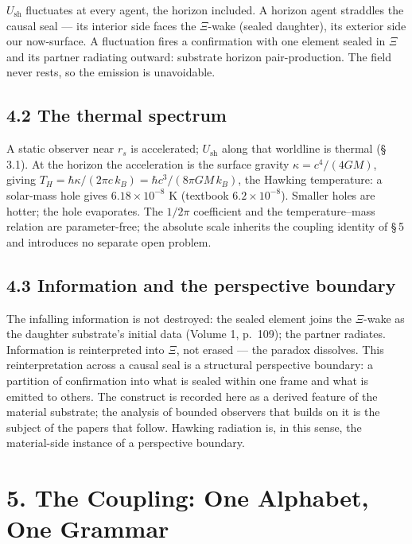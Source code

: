 \documentclass[11pt,oneside]{report}
\theoremstyle{definition}
\theoremstyle{remark}
\begin{document}
\ensuremath{U_{\mathrm{sh}}} fluctuates at every agent, the horizon
included. A horizon agent straddles the causal seal --- its interior side
faces the \ensuremath{\Xi}-wake (sealed daughter), its exterior side our
now-surface. A fluctuation fires a confirmation with one element sealed
in \ensuremath{\Xi} and its partner radiating outward: substrate horizon
pair-production. The field never rests, so the emission is unavoidable.

\subsection*{4.2 The thermal spectrum}

A static observer near \ensuremath{r_s} is accelerated;
\ensuremath{U_{\mathrm{sh}}} along that worldline is thermal (\S\,3.1). At
the horizon the acceleration is the surface gravity \ensuremath{\kappa =
c^4/(4GM)}, giving \ensuremath{T_H = \hbar \kappa/(2\pi c\, k_B) = \hbar
c^3/(8\pi GM\, k_B)}, the Hawking temperature: a solar-mass hole gives
\ensuremath{6.18 \times 10^{-8}} K (textbook \ensuremath{6.2 \times
10^{-8}}). Smaller holes are hotter; the hole evaporates. The
\ensuremath{1/2\pi} coefficient and the temperature--mass relation are
parameter-free; the absolute scale inherits the coupling identity of \S\,5
and introduces no separate open problem.

\subsection*{4.3 Information and the perspective boundary}

The infalling information is not destroyed: the sealed element joins the
\ensuremath{\Xi}-wake as the daughter substrate's initial data (Volume 1,
p.~109); the partner radiates. Information is reinterpreted into
\ensuremath{\Xi}, not erased --- the paradox dissolves. This
reinterpretation across a causal seal is a structural perspective
boundary: a partition of confirmation into what is sealed within one
frame and what is emitted to others. The construct is recorded here as a
derived feature of the material substrate; the analysis of bounded
observers that builds on it is the subject of the papers that follow.
Hawking radiation is, in this sense, the material-side instance of a
perspective boundary.

\section*{5. The Coupling: One Alphabet, One Grammar}
\end{document}
